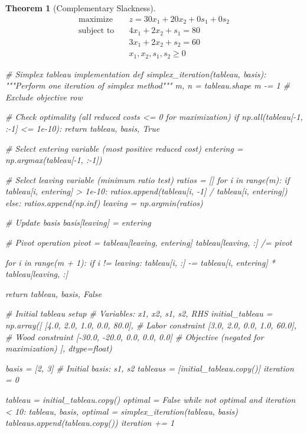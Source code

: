 \documentclass[a4paper, 11pt]{article}
\newtheorem{theorem}{Theorem}[section]
\begin{document}
\begin{theorem}[Complementary Slackness]
\begin{equation}
\begin{aligned}
\text{maximize} \quad & z = 30x_1 + 20x_2 + 0s_1 + 0s_2 \\
\text{subject to} \quad & 4x_1 + 2x_2 + s_1 = 80 \\
& 3x_1 + 2x_2 + s_2 = 60 \\
& x_1, x_2, s_1, s_2 \geq 0
\end{aligned}
\end{equation}

\begin{pycode}
# Simplex tableau implementation
def simplex_iteration(tableau, basis):
    """Perform one iteration of simplex method"""
    m, n = tableau.shape
    m -= 1  # Exclude objective row

    # Check optimality (all reduced costs <= 0 for maximization)
    if np.all(tableau[-1, :-1] <= 1e-10):
        return tableau, basis, True

    # Select entering variable (most positive reduced cost)
    entering = np.argmax(tableau[-1, :-1])

    # Select leaving variable (minimum ratio test)
    ratios = []
    for i in range(m):
        if tableau[i, entering] > 1e-10:
            ratios.append(tableau[i, -1] / tableau[i, entering])
        else:
            ratios.append(np.inf)
    leaving = np.argmin(ratios)

    # Update basis
    basis[leaving] = entering

    # Pivot operation
    pivot = tableau[leaving, entering]
    tableau[leaving, :] /= pivot

    for i in range(m + 1):
        if i != leaving:
            tableau[i, :] -= tableau[i, entering] * tableau[leaving, :]

    return tableau, basis, False

# Initial tableau setup
# Variables: x1, x2, s1, s2, RHS
initial_tableau = np.array([
    [4.0, 2.0, 1.0, 0.0, 80.0],  # Labor constraint
    [3.0, 2.0, 0.0, 1.0, 60.0],  # Wood constraint
    [-30.0, -20.0, 0.0, 0.0, 0.0]  # Objective (negated for maximization)
], dtype=float)

basis = [2, 3]  # Initial basis: s1, s2
tableaus = [initial_tableau.copy()]
iteration = 0

tableau = initial_tableau.copy()
optimal = False
while not optimal and iteration < 10:
    tableau, basis, optimal = simplex_iteration(tableau, basis)
    tableaus.append(tableau.copy())
    iteration += 1


\end{pycode}
\end{theorem}
\end{document}
